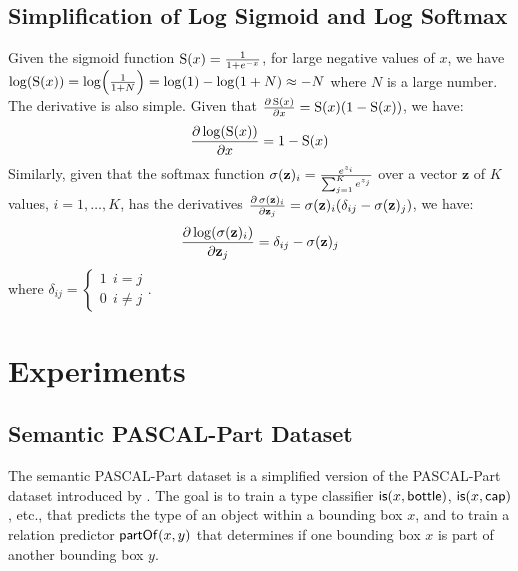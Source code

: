\subsection{Simplification of Log Sigmoid and Log Softmax}
\label{appendix:logsigmoid}
Given the sigmoid function $\operatorname{S}(x) = \frac{1}{1+e^{-x}}$, for large negative values of $x$, we have $\log(\operatorname{S}(x)) = \log(\frac{1}{1+N}) = \log(1)-\log(1+N) \approx -N$ where $N$ is a large number. 
The derivative is also simple. Given that $\partialderivative{\sigmoid(x)}{x} = \sigmoid(x) (1-\sigmoid(x))$, we have:
\begin{equation}
    \partialderivative{\log(\sigmoid(x))}{x} = 1-\sigmoid(x)
\end{equation}
Similarly, given that the softmax function $\operatorname{\sigma}(\mathbf{z})_i = \frac{e^{z_i}}{\sum_{j=1}^{K} e^{z_j}}$ over a vector $\mathbf{z}$ of $K$ values, $i=1,\dots,K$, 
has the derivatives $\partialderivative{\softmax(\mathbf{z})_i}{\mathbf{z}_j} = \softmax(\mathbf{z})_i (\delta_{ij}- \softmax(\mathbf{z})_j)$, we have:
\begin{equation}
    \partialderivative{\log(\softmax(\mathbf{z})_i)}{\mathbf{z}_j} = \delta_{ij}- \softmax(\mathbf{z})_j
\end{equation}
where $\delta_{ij} = \begin{cases}
        1 \ \ i=j\\
        0 \ \ i \neq j 
    \end{cases}$. 



\section{Experiments}
\subsection{Semantic PASCAL-Part Dataset}
\label{appendix:pascalpart}
The semantic PASCAL-Part dataset is a simplified version of the PASCAL-Part dataset introduced by \cite{pascalpart_chen_2014}. 
The goal is to train a type classifier $\mathsf{is}(x,\mathsf{bottle})$, $\mathsf{is}(x,\mathsf{cap})$, etc., that predicts the type of an object within a bounding box $x$,
 and to train a relation predictor $\mathsf{partOf}(x,y)$ that determines if one bounding box $x$ is part of another bounding box $y$.

